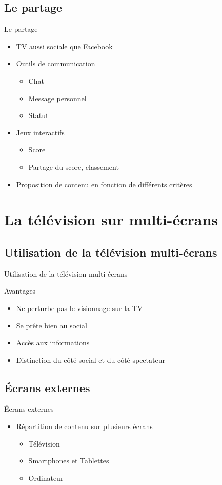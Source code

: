 \documentclass{beamer}
\begin{document}
	\subsection{Le partage}
	\begin{frame}{Le partage}
	\begin{itemize}
		\item TV aussi sociale que Facebook
			\vfill
		\pause
		\item Outils de communication
			\begin{itemize}
				\item Chat
				\item Message personnel
				\item Statut
			\end{itemize}
			\vfill
		\pause
		\item Jeux interactifs
			\begin{itemize}
				\item Score
				\item Partage du score, classement
			\end{itemize}
			\vfill
		\pause
		\item Proposition de contenu en fonction de différents critères
			\vfill
	\end{itemize}
\end{frame}
	\section{La télévision sur multi-écrans}
	\subsection{Utilisation de la télévision multi-écrans}
	\begin{frame}{Utilisation de la télévision multi-écrans}
		\begin{exampleblock}{Avantages}
			\begin{itemize}
				\item Ne perturbe pas le visionnage sur la TV
				\item Se prête bien au social
				\item Accès aux informations
				\item Distinction du côté social et du côté spectateur
			\end{itemize}
		\end{exampleblock}
	\end{frame}
	\subsection{Écrans externes}
	\begin{frame}{Écrans externes}
\begin{itemize}
	\item Répartition de contenu sur plusieurs écrans
		\begin{itemize}
			\item Télévision
			\item Smartphones et Tablettes
			\item Ordinateur
		\end{itemize}
\end{itemize}
	\end{frame}
\end{document}
